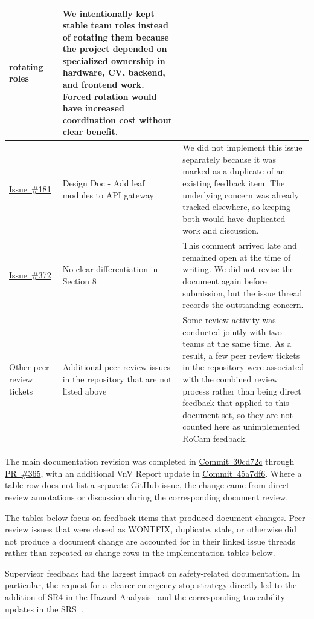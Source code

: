 \documentclass{article}
\newcommand{\ghIssue}[1]{\href{https://github.com/ZifanSi/vision-guided-tracker/issues/#1}{Issue~\##1}}
\newcommand{\ghPR}[1]{\href{https://github.com/ZifanSi/vision-guided-tracker/pull/#1}{PR~\##1}}
\newcommand{\ghCommit}[2]{\href{https://github.com/ZifanSi/vision-guided-tracker/commit/#1}{Commit~#2}}
\begin{document}
\begin{longtable}{|L{2.1cm}|L{5.3cm}|L{6cm}|}
  rotating roles &
  We intentionally kept stable team roles instead of rotating them because the
  project depended on specialized ownership in hardware, CV, backend, and
  frontend work. Forced rotation would have increased coordination cost without
  clear benefit. \\
  \hline
  \ghIssue{181} &
  Design Doc - Add leaf modules to API gateway &
  We did not implement this issue separately because it was marked as a
  duplicate of an existing feedback item. The underlying concern was already
  tracked elsewhere, so keeping both would have duplicated work and discussion. \\
  \hline
  \ghIssue{372} &
  No clear differentiation in Section 8 &
  This comment arrived late and remained open at the time of writing. We did
  not revise the document again before submission, but the issue thread records
  the outstanding concern. \\
  \hline
  Other peer review tickets &
  Additional peer review issues in the repository that are not listed above &
  Some review activity was conducted jointly with two teams at the same time.
  As a result, a few peer review tickets in the repository were associated with
  the combined review process rather than being direct feedback that applied to
  this document set, so they are not counted here as unimplemented RoCam
  feedback. \\
  \hline
\end{longtable}

The main documentation revision was completed in
\ghCommit{30cd72c86c5ebf03a82fe1bf078d257ad5a5a88a}{30cd72c}
through \ghPR{365}, with an additional VnV Report update in
\ghCommit{45a7df634441cacb560f3a238e4f6942b7322cd9}{45a7df6}. Where a table row
does not list a separate GitHub issue, the change came from direct review
annotations or discussion during the corresponding document review.

The tables below focus on feedback items that produced document changes. Peer
review issues that were closed as WONTFIX, duplicate, stale, or otherwise did
not produce a document change are accounted for in their linked issue threads
rather than repeated as change rows in the implementation tables below.

Supervisor feedback had the largest impact on safety-related documentation. In
particular, the request for a clearer emergency-stop strategy directly led to
the addition of SR4 in the Hazard Analysis~\cite{HazardAnalysis} and the
corresponding traceability updates in the SRS~\cite{SRS}.
\end{document}
